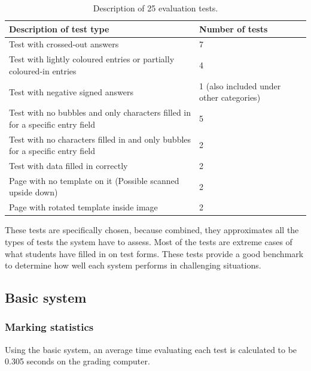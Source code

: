 \begin{table}
\caption{Description of 25 evaluation tests.} \label{tbl:25Tests}
  \centering
\begin{tabular}{|p{6cm}|p{4cm}|}
\hline
\textbf{Description of test type}&\textbf{Number of tests}\\
\hline
Test with crossed-out answers&7\\
\hline
Test with lightly coloured entries or partially coloured-in entries&4\\
\hline
Test with negative signed answers&1 (also included under other categories)\\
\hline
Test with no bubbles and only characters filled in for a specific entry field &5\\
\hline
Test with no characters filled in and only bubbles for a specific entry field&2\\
\hline
Test with data filled in correctly&2\\
\hline
Page with no template on it (Possible scanned upside down)&2\\
\hline
Page with rotated template inside image&2\\
\hline
\end{tabular} 
\end{table}

These tests are specifically chosen, because combined, they approximates all the types of tests the system have to assess. Most of the tests are extreme cases of what students have filled in on test forms. These tests provide a good benchmark to determine how well each system performs in challenging situations.

\subsection{Basic system}
\subsubsection{Marking statistics}

Using the basic system, an average time evaluating each test is calculated to be 0.305 seconds on the grading computer. 

